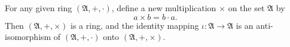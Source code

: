 For any given ring $(\mathfrak{A}, +, \cdot)$, define a new multiplication $\times$ on the set $\mathfrak{A}$ by
$$a \times b = b \cdot a.$$
Then $(\mathfrak{A}, +, \times)$ is a ring, and the identity mapping $\iota: \mathfrak{A} \to \mathfrak{A}$ is an anti-isomorphism of $(\mathfrak{A}, +, \cdot)$ onto $(\mathfrak{A}, +, \times)$.
